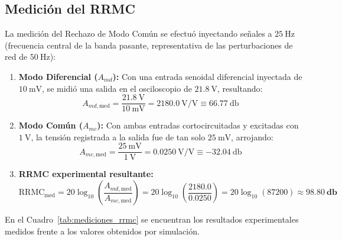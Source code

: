 \subsection{Medición del RRMC}
La medición del Rechazo de Modo Común se efectuó inyectando señales a $\SI{25}{\hertz}$ (frecuencia central de la banda pasante, representativa de las perturbaciones de red de $\SI{50}{\hertz}$):
\begin{enumerate}
  \item \textbf{Modo Diferencial ($A_{md}$):} Con una entrada senoidal diferencial inyectada de $\SI{10}{\milli\volt}$, se midió una salida en el osciloscopio de $\SI{21.8}{\volt}$, resultando:
  \begin{equation*}
    A_{md,\text{med}} = \frac{\SI{21.8}{\volt}}{\SI{10}{\milli\volt}} = 2180.0\ \text{V/V} \equiv \SI{66.77}{\decibel}
  \end{equation*}
  \item \textbf{Modo Común ($A_{mc}$):} Con ambas entradas cortocircuitadas y excitadas con $\SI{1}{\volt}$, la tensión registrada a la salida fue de tan solo $\SI{25}{\milli\volt}$, arrojando:
  \begin{equation*}
    A_{mc,\text{med}} = \frac{\SI{25}{\milli\volt}}{\SI{1}{\volt}} = 0.0250\ \text{V/V} \equiv -\SI{32.04}{\decibel}
  \end{equation*}
  \item \textbf{RRMC experimental resultante:}
  \begin{equation*}
    \text{RRMC}_{\text{med}} = 20 \log_{10} \left( \frac{A_{md,\text{med}}}{A_{mc,\text{med}}} \right) = 20 \log_{10} \left( \frac{2180.0}{0.0250} \right) = 20 \log_{10}(87200) \approx \mathbf{\SI{98.80}{\decibel}}
  \end{equation*}
\end{enumerate}

En el Cuadro~\ref{tab:mediciones_rrmc} se encuentran los resultados
experimentales medidos frente a los valores obtenidos por simulación.

